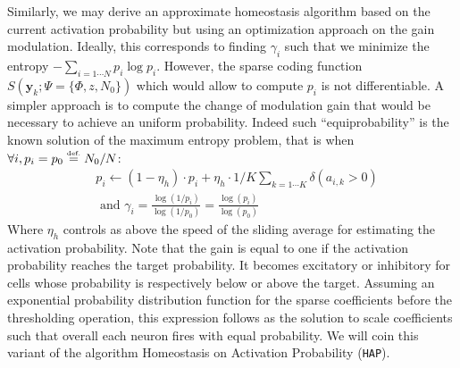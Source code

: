 \documentclass[vision,article,submit,oneauthor,pdftex]{Definitions/mdpi}
\newcommand{\image}{\mathbf{y}} %
\newcommand{\dico}{\Phi} %
\newcommand{\eqdef}{\ensuremath{\stackrel{\mbox{\upshape\tiny def.}}{=}}}
\begin{document}
Similarly, we may derive an approximate homeostasis algorithm based on the current activation probability but using an optimization approach on the gain modulation. Ideally, this corresponds to finding $\gamma_i$ such that we minimize the entropy $-\sum_{i=1\cdots N} p_i \log p_i$. However, the sparse coding function $S(\image_k; \Psi=\{\dico, z, N_0\})$ which would allow to compute $p_i$ is not differentiable. %
A simpler approach is to compute the change of modulation gain that would be necessary to achieve an uniform probability. Indeed such ``equiprobability'' is the known solution of the maximum entropy problem, that is when $\forall i, p_i = p_0 \eqdef N_0 / N$: %
\begin{align}%
&p_i \leftarrow (1- \eta_h ) \cdot p_i + \eta_h \cdot 1/K\sum_{k=1\cdots K} \delta(a_{i, k} > 0) \\ &\textrm{ and }
\gamma_i = \frac{\log(1/p_i)}{\log(1/p_0)} = \frac{\log(p_i)}{\log(p_0)}
\end{align}%
Where $\eta_h$ controls as above the speed of the sliding average for estimating the activation probability. Note that the gain is equal to one if the activation probability reaches the target probability. It becomes excitatory or inhibitory for cells whose probability is respectively below or above the target. Assuming an exponential probability distribution function for the sparse coefficients before the thresholding operation, this expression follows as the solution to scale coefficients such that overall each neuron fires with equal probability. We will coin this variant of the algorithm Homeostasis on Activation Probability (\texttt{HAP}).
\end{document}
